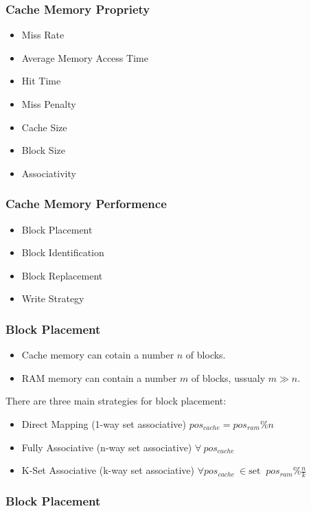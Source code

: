 \begin{frame}
    \frametitle{Cache Memory Propriety}
    \begin{itemize}
        \item Miss Rate
        \item Average Memory Access Time
        \item Hit Time
        \item Miss Penalty
        \item Cache Size
        \item Block Size
        \item Associativity
    \end{itemize}
\end{frame}

\begin{frame}
    \frametitle{Cache Memory Performence}
    \begin{itemize}
        \item Block Placement
        \item Block Identification
        \item Block Replacement
        \item Write Strategy
    \end{itemize}
\end{frame}

\begin{frame}
    \frametitle{Block Placement}
    \begin{itemize}
        \item Cache memory can cotain a number $n$ of blocks.
        \item RAM memory can contain a number $m$ of blocks, ussualy $m \gg n$.
    \end{itemize}
    There are three main strategies for block placement:
    \begin{itemize}
        \item Direct Mapping (1-way set associative) $pos_{cache}=pos_{ram} \% n$
        \item Fully Associative (n-way set associative) $ \forall \ pos_{cache}$
        \item K-Set Associative (k-way set associative) $\forall pos_{cache} \ \in \text{set } \ pos_{ram} \% \frac{n}{k}$
    \end{itemize}
\end{frame}

\begin{frame}
    \frametitle{Block Placement}
\end{frame}

